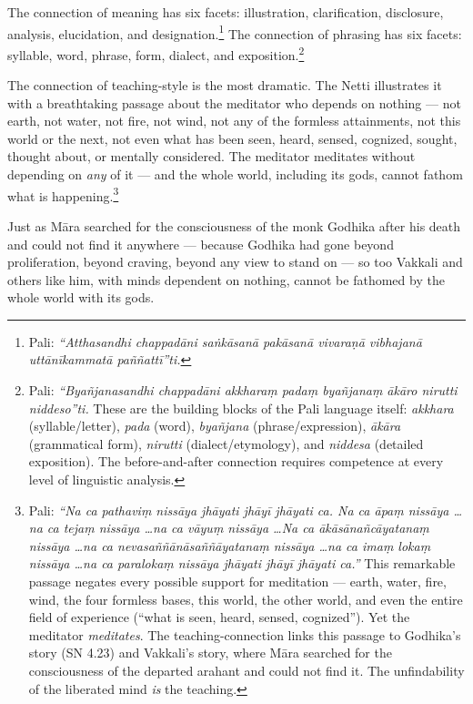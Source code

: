 The connection of meaning has six facets: illustration, clarification, disclosure, analysis, elucidation, and designation.\footnote{Pali: \textit{``Atthasandhi chappadāni saṅkāsanā pakāsanā vivaraṇā vibhajanā uttānīkammatā paññattī''ti.}} The connection of phrasing has six facets: syllable, word, phrase, form, dialect, and exposition.\footnote{Pali: \textit{``Byañjanasandhi chappadāni akkharaṃ padaṃ byañjanaṃ ākāro nirutti niddeso''ti.} These are the building blocks of the Pali language itself: \textit{akkhara} (syllable/letter), \textit{pada} (word), \textit{byañjana} (phrase/expression), \textit{ākāra} (grammatical form), \textit{nirutti} (dialect/etymology), and \textit{niddesa} (detailed exposition). The before-and-after connection requires competence at every level of linguistic analysis.}

The connection of teaching-style is the most dramatic. The Netti illustrates it with a breathtaking passage about the meditator who depends on nothing --- not earth, not water, not fire, not wind, not any of the formless attainments, not this world or the next, not even what has been seen, heard, sensed, cognized, sought, thought about, or mentally considered. The meditator meditates without depending on \textit{any} of it --- and the whole world, including its gods, cannot fathom what is happening.\footnote{Pali: \textit{``Na ca pathaviṃ nissāya jhāyati jhāyī jhāyati ca. Na ca āpaṃ nissāya \ldots na ca tejaṃ nissāya \ldots na ca vāyuṃ nissāya \ldots Na ca ākāsānañcāyatanaṃ nissāya \ldots na ca nevasaññānāsaññāyatanaṃ nissāya \ldots na ca imaṃ lokaṃ nissāya \ldots na ca paralokaṃ nissāya jhāyati jhāyī jhāyati ca.''} This remarkable passage negates every possible support for meditation --- earth, water, fire, wind, the four formless bases, this world, the other world, and even the entire field of experience (``what is seen, heard, sensed, cognized''). Yet the meditator \textit{meditates}. The teaching-connection links this passage to Godhika's story (SN 4.23) and Vakkali's story, where Māra searched for the consciousness of the departed arahant and could not find it. The unfindability of the liberated mind \textit{is} the teaching.}

Just as Māra searched for the consciousness of the monk Godhika after his death and could not find it anywhere --- because Godhika had gone beyond proliferation, beyond craving, beyond any view to stand on --- so too Vakkali and others like him, with minds dependent on nothing, cannot be fathomed by the whole world with its gods.


